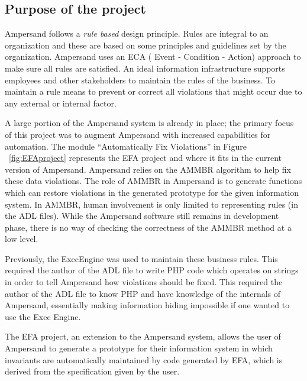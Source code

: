 %

\subsection{Purpose of the project}

Ampersand follows a \emph{rule based} design principle. Rules are integral to an organization
and these are based on some principles and guidelines set by the organization.
Ampersand uses an ECA ( Event - Condition - Action) approach to make sure all rules are satisfied. An ideal information infrastructure supports employees and other stakeholders to maintain the rules of the business. To maintain a rule means to prevent or correct all violations that might occur due to any external or internal factor.
 
 A large portion of the Ampersand system is already in place; the primary focus of this project was to
augment Ampersand with increased capabilities for automation. The module ``Automatically Fix Violations'' in Figure ~\ref{fig:EFAproject} represents the EFA project and where it fits in the current version of Ampersand.
Ampersand relies on the AMMBR \citep{Ampersand} algorithm to help fix these data violations. 
The role 
of AMMBR in Ampersand is to generate functions which can restore violations
in the generated prototype for the given information system. In AMMBR, human involvement is only limited 
to representing rules (in the ADL files). While the Ampersand software still 
remains in development phase, there is no way of checking the correctness of 
the AMMBR method at a low level. 

Previously, the ExecEngine was used to 
maintain these business rules. This required the author of the ADL file 
to write PHP code which operates on strings in order to tell Ampersand
how violations should be fixed. This required the author of the 
ADL file to know PHP and have knowledge of the internals of Ampersand,
essentially making information hiding impossible if one wanted to use
the Exec Engine. 
 
The EFA project, an extension to the Ampersand system, allows 
the user of Ampersand to generate a prototype for their information
system in which invariants are automatically maintained by code 
generated by EFA, which is derived from the specification given by the user.

